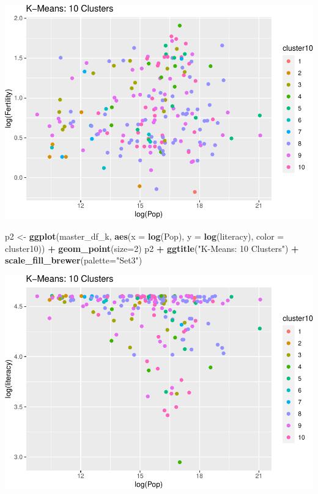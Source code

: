 \documentclass[]{article}
\newenvironment{Shaded}{\begin{snugshade}}{\end{snugshade}}
\newcommand{\DataTypeTok}[1]{\textcolor[rgb]{0.13,0.29,0.53}{#1}}
\newcommand{\DecValTok}[1]{\textcolor[rgb]{0.00,0.00,0.81}{#1}}
\newcommand{\KeywordTok}[1]{\textcolor[rgb]{0.13,0.29,0.53}{\textbf{#1}}}
\newcommand{\NormalTok}[1]{#1}
\newcommand{\OperatorTok}[1]{\textcolor[rgb]{0.81,0.36,0.00}{\textbf{#1}}}
\newcommand{\StringTok}[1]{\textcolor[rgb]{0.31,0.60,0.02}{#1}}
\begin{document}
\includegraphics{eda_files/figure-latex/unnamed-chunk-29-7.pdf}

\begin{Shaded}
\begin{Highlighting}[]
\NormalTok{p2 <-}\StringTok{ }\KeywordTok{ggplot}\NormalTok{(master_df_k, }\KeywordTok{aes}\NormalTok{(}\DataTypeTok{x =} \KeywordTok{log}\NormalTok{(Pop), }\DataTypeTok{y =} \KeywordTok{log}\NormalTok{(literacy), }\DataTypeTok{color =}\NormalTok{ cluster10)) }\OperatorTok{+}
\StringTok{  }\KeywordTok{geom_point}\NormalTok{(}\DataTypeTok{size=}\DecValTok{2}\NormalTok{)}
\NormalTok{p2 }\OperatorTok{+}\StringTok{ }\KeywordTok{ggtitle}\NormalTok{(}\StringTok{"K-Means: 10 Clusters"}\NormalTok{) }\OperatorTok{+}\StringTok{ }\KeywordTok{scale_fill_brewer}\NormalTok{(}\DataTypeTok{palette=}\StringTok{"Set3"}\NormalTok{)}
\end{Highlighting}
\end{Shaded}

\includegraphics{eda_files/figure-latex/unnamed-chunk-29-8.pdf}
\end{document}
